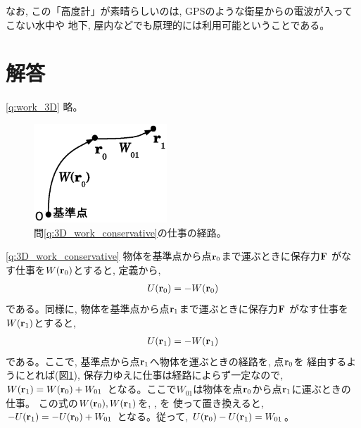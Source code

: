 なお, この「高度計」が素晴らしいのは, GPSのような衛星からの電波が入ってこない水中や
地下, 屋内などでも原理的には利用可能ということである。\\

\section{解答}
{}\ref{q:work_3D} 略。\mv

%
\begin{figure}[h]
    \centering
    \includegraphics[width=5.0cm]{cons_force_3D.eps}
    \caption{問\ref{q:3D_work_conservative}の仕事の経路。}\label{fig:cons_force_3D}
\end{figure}
\ref{q:3D_work_conservative}
物体を基準点から点${\bf r}_0$まで運ぶときに保存力${\bf F}$
がなす仕事を$W({\bf r}_0)$とすると, 定義から, 
\begin{eqnarray}
U({\bf r}_0)=-W({\bf r}_0)\label{q:3D_work_conservative_ans1}
\end{eqnarray}
である。同様に, 物体を基準点から点${\bf r}_1$まで運ぶときに保存力${\bf F}$
がなす仕事を$W({\bf r}_1)$とすると, 
\begin{eqnarray}
U({\bf r}_1)=-W({\bf r}_1)\label{q:3D_work_conservative_ans2}
\end{eqnarray}
である。ここで, 基準点から点${\bf r}_1$へ物体を運ぶときの経路を, 点${\bf r}_0$を
経由するようにとれば(図\ref{fig:cons_force_3D}), 保存力ゆえに仕事は経路によらず一定なので, 
$W({\bf r}_1)=W({\bf r}_0)+W_{01}$
となる。ここで$W_{01}$は物体を点${\bf r}_0$から点${\bf r}_1$に運ぶときの仕事。
この式の$W({\bf r}_0), W({\bf r}_1)$を, 
, を
使って置き換えると, 
$-U({\bf r}_1)=-U({\bf r}_0)+W_{01}$
となる。従って, 
$U({\bf r}_0)-U({\bf r}_1)=W_{01}$。
\mv

